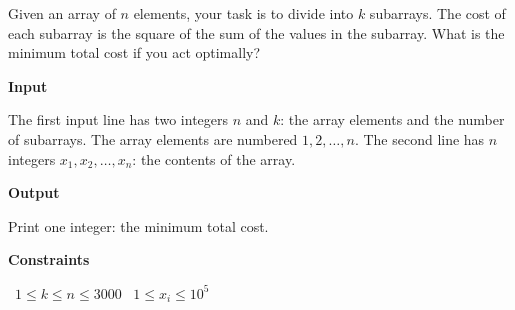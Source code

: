 Given an array of $n$ elements, your task is to divide into $k$ subarrays. The cost of each subarray is the square of the sum of the values in the subarray. What is the minimum total cost if you act optimally?

\vspace{0.3cm}\noindent\textbf{Input}

The first input line has two integers $n$ and $k$: the array elements and the number of subarrays. The array elements are numbered $1,2,\dots,n$.
The second line has $n$ integers $x_1,x_2,\dots,x_n$: the contents of the array.

\vspace{0.3cm}\noindent\textbf{Output}

Print one integer: the minimum total cost.

\vspace{0.3cm}\noindent\textbf{Constraints}

\textbullet\ $1 \le k \le n \le 3000$
\textbullet\ $1 \le x_i \le 10^5$